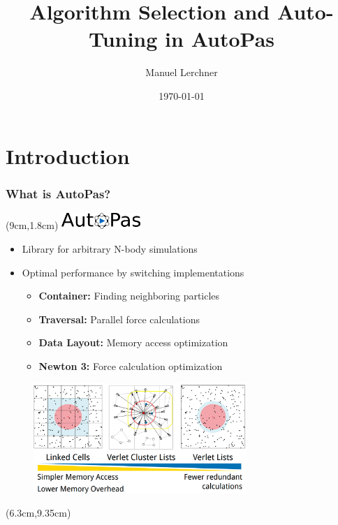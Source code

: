 \documentclass[
	10pt,
	t		%
]{beamer}
\title{Algorithm Selection and Auto-Tuning in AutoPas}
\author{Manuel Lerchner}
\date{\today}
\begin{document}
\maketitle

\setcounter{framenumber}{0}

\section{Introduction}
\begin{frame}
    \frametitle{What is AutoPas?}

    \begin{textblock*}{5cm}(9cm,1.8cm)
        \includegraphics[width=3cm]{figures/AutoPasLogo}
    \end{textblock*}

    \begin{itemize}
        \item Library for arbitrary N-body simulations
        \item Optimal performance by switching implementations
              \begin{itemize}
                  \item \textbf{Container:} Finding neighboring particles
                  \item \textbf{Traversal:} Parallel force calculations
                  \item \textbf{Data Layout:} Memory access optimization
                  \item \textbf{Newton 3:} Force calculation optimization
              \end{itemize}
    \end{itemize}

    \vspace{-0.1cm}
    \begin{figure}
        \centering
        \includegraphics[width=0.72\textwidth]{figures/traversals.png}
    \end{figure}

    \begin{textblock*}{5cm}(6.3cm,9.35cm)
        \tiny{\cite{SIAM_PP24}}
    \end{textblock*}

\end{frame}
\end{document}
